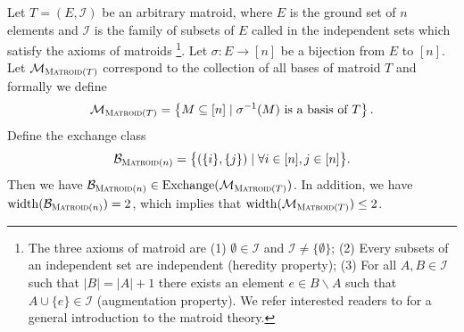\documentclass{article}
\newcommand{\M}{\mathcal M}
\newcommand{\B}{\mathcal B}
\newcommand{\del}{\backslash}
\DeclareMathOperator{\rank}{width}
\DeclareMathOperator{\Exchange}{Exchange}
\newcommand{\Matroid}{\textsc{Matroid}\xspace}
\begin{document}
\begin{fact}[Matroid]
\label{fact:matroid}
Let $T=(E,\mathcal I)$ be an arbitrary matroid, where $E$ is the ground set of $n$ elements 
and $\mathcal I$ is the family of subsets of $E$ called in the independent sets which satisfy the axioms of matroids
\footnote{The three axioms of matroid are (1) $\emptyset\in \mathcal I$ and $\mathcal I\not=\{\emptyset\}$; (2) Every subsets of an independent set are independent (heredity property); (3) For all $A,B\in \mathcal I$ such that $|B|=|A|+1$ there exists an element $e\in B\del A$ such that $A\cup \{e\} \in \mathcal I$ (augmentation property). We refer interested readers to \citep{oxley2006matroid} for a general introduction to the matroid theory.}.
Let $\sigma\colon E\rightarrow [n]$ be a bijection from $E$ to $[n]$.
Let $\M_{\Matroid(T)}$ correspond to the collection of all bases of matroid $T$ and formally we define
\begin{equation}
\label{eq:matroid}
\M_{\Matroid(T)} = \left\{M\subseteq[n] \mid \sigma^{-1}(M)\text{ is a basis of } T\right\}.
\end{equation}
Define the exchange class
\begin{equation}
\label{eq:bmatroid}
\B_{\Matroid(n)}=\big\{(\{i\},\{j\})\mid\forall i\in [n], j\in [n]\big\}.
\end{equation}
Then we have $\B_{\Matroid(n)} \in \Exchange(\M_{\Matroid(T)})$.
In addition, we have $\rank(\B_{\Matroid(n)}) = 2$, which implies that $\rank(\M_{\Matroid(T)}) \le 2$. 
\end{fact}
\end{document}
